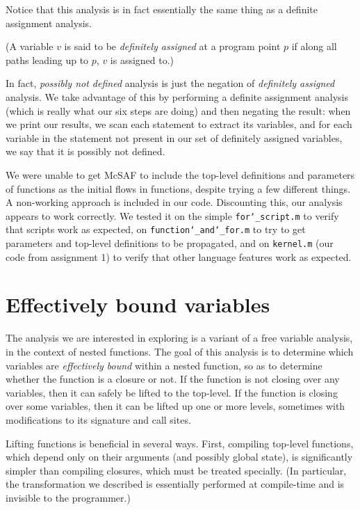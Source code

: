 \documentclass[letterpaper,11pt]{article}
\begin{document}
Notice that this analysis is in fact essentially the same thing as a definite
assignment analysis.

(A variable $v$ is said to be \emph{definitely assigned} at a program point $p$
if along all paths leading up to $p$, $v$ is assigned to.)

In fact, \emph{possibly not defined} analysis is just the negation of
\emph{definitely assigned} analysis. We take advantage of this by performing a
definite assignment analysis (which is really what our six steps are doing) and
then negating the result: when we print our results, we scan each statement to
extract its variables, and for each variable in the statement not present in
our set of definitely assigned variables, we say that it is possibly not
defined.

We were unable to get McSAF to include the top-level definitions and parameters
of functions as the initial flows in functions, despite trying a few different
things. A non-working approach is included in our code. Discounting this, our
analysis appears to work correctly. We tested it on the simple
\texttt{for\char`_script.m} to verify that scripts work as expected, on
\texttt{function\char`_and\char`_for.m} to try to get parameters and top-level
definitions to be propagated, and on \texttt{kernel.m} (our code from
assignment 1) to verify that other language features work as expected.

\section{Effectively bound variables}

The analysis we are interested in exploring is a variant of a free variable
analysis, in the context of nested functions. The goal of this analysis is to
determine which variables are \emph{effectively bound} within a nested
function, so as to determine whether the function is a closure or not. If the
function is not closing over any variables, then it can safely be lifted to the
top-level. If the function is closing over some variables, then it can be
lifted up one or more levels, sometimes with modifications to its signature and
call sites.

Lifting functions is beneficial in several ways. First, compiling top-level
functions, which depend only on their arguments (and possibly global state), is
significantly simpler than compiling closures, which must be treated specially.
(In particular, the transformation we described is essentially performed at
compile-time and is invisible to the programmer.)
\end{document}
